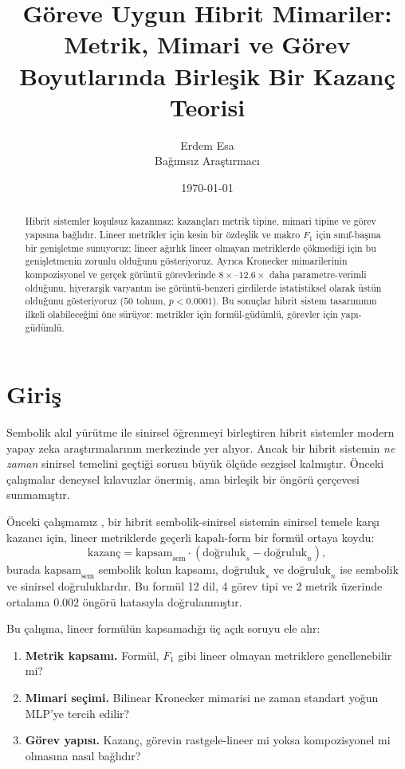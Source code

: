 \documentclass[11pt,a4paper]{article}
\title{Göreve Uygun Hibrit Mimariler:\\
Metrik, Mimari ve Görev Boyutlarında Birleşik Bir Kazanç Teorisi}
\author{Erdem Esa\\ \small Bağımsız Araştırmacı}
\date{\today}
\begin{document}
\maketitle

\begin{abstract}
Hibrit sistemler koşulsuz kazanmaz: kazançları metrik tipine, mimari
tipine ve görev yapısına bağlıdır. Lineer metrikler için kesin bir
özdeşlik ve makro $F_1$ için sınıf-başına bir genişletme sunuyoruz;
lineer ağırlık lineer olmayan metriklerde çökmediği için bu genişletmenin
zorunlu olduğunu gösteriyoruz. Ayrıca Kronecker mimarilerinin
kompozisyonel ve gerçek görüntü görevlerinde $8\times$--$12.6\times$
daha parametre-verimli olduğunu, hiyerarşik varyantın ise görüntü-benzeri
girdilerde istatistiksel olarak üstün olduğunu gösteriyoruz
($50$ tohum, $p<0.0001$). Bu
sonuçlar hibrit sistem tasarımının ilkeli olabileceğini öne sürüyor:
metrikler için formül-güdümlü, görevler için yapı-güdümlü.
\end{abstract}


\section{Giriş}
\label{sec:intro}

Sembolik akıl yürütme ile sinirsel öğrenmeyi birleştiren hibrit
sistemler modern yapay zeka araştırmalarının merkezinde yer alıyor.
Ancak bir hibrit sistemin \emph{ne zaman} sinirsel temelini geçtiği
sorusu büyük ölçüde sezgisel kalmıştır. Önceki çalışmalar deneysel
kılavuzlar önermiş, ama birleşik bir öngörü çerçevesi sunmamıştır.

Önceki çalışmamız \cite{esa2026preprint1}, bir hibrit sembolik-sinirsel
sistemin sinirsel temele karşı kazancı için, lineer metriklerde geçerli
kapalı-form bir formül ortaya koydu:
\begin{equation}
\text{kazanç} = \text{kapsam}_{\text{sem}} \cdot
(\text{doğruluk}_s - \text{doğruluk}_n),
\label{eq:linear}
\end{equation}
burada $\text{kapsam}_{\text{sem}}$ sembolik kolun kapsamı,
$\text{doğruluk}_s$ ve $\text{doğruluk}_n$ ise sembolik ve sinirsel
doğruluklardır. Bu formül 12 dil, 4 görev tipi ve 2 metrik üzerinde
ortalama $0.002$ öngörü hatasıyla doğrulanmıştır.

Bu çalışma, lineer formülün kapsamadığı üç açık soruyu ele alır:

\begin{enumerate}
\item \textbf{Metrik kapsamı.} Formül, $F_1$ gibi lineer olmayan
metriklere genellenebilir mi?
\item \textbf{Mimari seçimi.} Bilinear Kronecker mimarisi ne zaman
standart yoğun MLP'ye tercih edilir?
\item \textbf{Görev yapısı.} Kazanç, görevin rastgele-lineer mi yoksa
kompozisyonel mi olmasına nasıl bağlıdır?
\end{enumerate}
\end{document}
